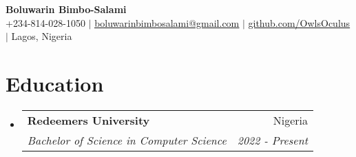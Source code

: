 \documentclass[letterpaper,11pt]{article}
\makeatletter
\newcommand{\resumeItem}[1]{
  \item\small{
    {#1 \vspace{-2pt}}
  }
}
\newcommand{\resumeSubheading}[4]{
  \vspace{-2pt}\item
    \begin{tabular*}{0.97\textwidth}[t]{l@{\extracolsep{\fill}}r}
      \textbf{#1} & #2 \\
      \textit{\small#3} & \textit{\small #4} \\
    \end{tabular*}\vspace{-7pt}
}
\newcommand{\resumeSubSubheading}[2]{
    \item
    \begin{tabular*}{0.97\textwidth}{l@{\extracolsep{\fill}}r}
      \textit{\small#1} & \textit{\small #2} \\
    \end{tabular*}\vspace{-7pt}
}
\newcommand{\resumeSubHeadingListStart}{\begin{itemize}[leftmargin=0.15in, label={}]}
\newcommand{\resumeSubHeadingListEnd}{\end{itemize}}
\newcommand{\resumeItemListStart}{\begin{itemize}}
\newcommand{\resumeItemListEnd}{\end{itemize}\vspace{-5pt}}
\makeatother
\begin{document}
\begin{center}
    \textbf{\Huge Boluwarin Bimbo-Salami} \\ \vspace{1pt}
    \small +234-814-028-1050 $|$ \href{mailto:boluwarinbimbosalami@gmail.com}{\underline{boluwarinbimbosalami@gmail.com}} $|$ 
    \href{https://github.com/OwlsOculus}{\underline{github.com/OwlsOculus}} $|$  
    \small Lagos, Nigeria
\end{center}


\section{Education}
  \resumeSubHeadingListStart
    \resumeSubheading
      {Redeemers University}{Nigeria}
      {Bachelor of Science in Computer Science}{2022 - Present}
  \resumeSubHeadingListEnd



\end{document}
